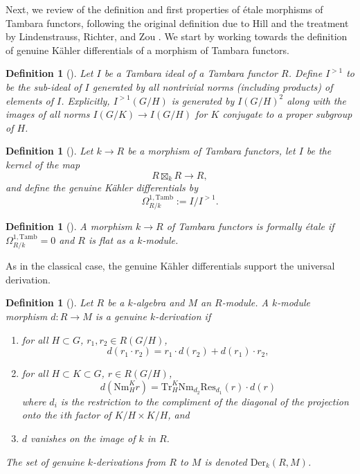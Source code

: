 \documentclass[11pt,dvipsnames]{amsart}
\theoremstyle{BoldRemark}
\newtheorem{definition}[theorem]{Definition}
\newcommand{\Res}{\mathrm{Res}}
\newcommand{\Nm}{\mathrm{Nm}}
\newcommand{\Der}{\mathrm{Der}}
\newcommand{\Tr}{\mathrm{Tr}}
\newcommand{\Tamb}{\mathrm{Tamb}}
\begin{document}
Next, we review of the definition and first properties of \'{e}tale morphisms of Tambara functors, following the original definition due to Hill \cite{Hil17} and the treatment by Lindenstrauss, Richter, and Zou \cite{LRZ24}. We start by working towards the definition of genuine K\"{a}hler differentials of a morphism of Tambara functors.

\begin{definition}[\cite{Hil17}]
	Let $I$ be a Tambara ideal of a Tambara functor $R$. Define $I^{>1}$ to be the sub-ideal of $I$ generated by all nontrivial norms (including products) of elements of $I$. Explicitly, $I^{>1}(G/H)$ is generated by $I(G/H)^2$ along with the images of all norms $I(G/K) \rightarrow I(G/H)$ for $K$ conjugate to a proper subgroup of $H$.
\end{definition}

\begin{definition}[\cite{Hil17}]
	Let $k \rightarrow R$ be a morphism of Tambara functors, let $I$ be the kernel of the map 
    \[ 
        R \boxtimes_k R \rightarrow R \mathrm{,} 
    \] 
    and define the genuine K\"{a}hler differentials by 
    \[ 
        \Omega^{1,\Tamb}_{R/k} := I/I^{>1} . 
    \]
\end{definition}

\begin{definition}[\cite{Hil17}]
	A morphism $k \rightarrow R$ of Tambara functors is \emph{formally \'{e}tale} if $\Omega^{1,\Tamb}_{R/k} = 0$ and $R$ is flat as a $k$-module.
\end{definition}

As in the classical case, the genuine K\"{a}hler differentials support the universal derivation.

\begin{definition}[{\cite[Definition 4.1]{Hil17}}]\label{def:genuine-k-derivation}
    Let $R$ be a $k$-algebra and $M$ an $R$-module. A $k$-module morphism $d : R \rightarrow M$ is a \emph{genuine $k$-derivation} if
    \begin{enumerate}
        \item for all $H \subset G$, $r_1, r_2 \in R(G/H)$, 
        \[ 
            d(r_1 \cdot r_2) = r_1 \cdot d(r_2) + d(r_1) \cdot r_2 ,
        \] 
        \item for all $H \subset K \subset G$, $r \in R(G/H)$, 
        \[ 
            d(\Nm_H^K r) = \Tr_H^K \Nm_{d_2} \Res_{d_1}(r) \cdot d(r) 
        \] 
        where $d_i$ is the restriction to the compliment of the diagonal of the projection onto the $i$th factor of $K/H \times K/H$, and
        \item $d$ vanishes on the image of $k$ in $R$.
    \end{enumerate}
    The set of genuine $k$-derivations from $R$ to $M$ is denoted $\Der_k(R,M)$.
\end{definition}
\end{document}
